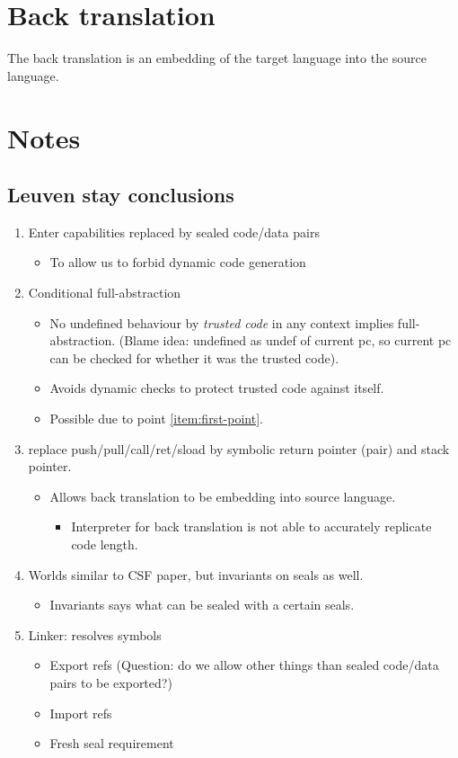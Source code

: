\documentclass[a4paper]{article}
\begin{document}
\clearpage
\section{Back translation}
The back translation is an embedding of the target language into the source language.

\section{Notes}
\subsection{Leuven stay conclusions}
\begin{enumerate}
\item Enter capabilities replaced by sealed code/data pairs \label{item:first-point}
  \begin{itemize}
  \item To allow us to forbid dynamic code generation
  \end{itemize}
\item Conditional full-abstraction
  \begin{itemize}
  \item No undefined behaviour by \emph{trusted code} in any context implies full-abstraction. (Blame idea: undefined as undef of current pc, so current pc can be checked for whether it was the trusted code).
  \item Avoids dynamic checks to protect trusted code against itself.
  \item Possible due to point \ref{item:first-point}.
  \end{itemize}
\item replace push/pull/call/ret/sload by symbolic return pointer (pair) and stack pointer.
  \begin{itemize}
  \item Allows back translation to be embedding into source language.
    \begin{itemize}
    \item Interpreter for back translation is not able to accurately replicate code length.
    \end{itemize}
  \end{itemize}
\item Worlds similar to CSF paper, but invariants on seals as well.
  \begin{itemize}
  \item Invariants says what can be sealed with a certain seals.
  \end{itemize}
\item Linker: resolves symbols
  \begin{itemize}
  \item Export refs (Question: do we allow other things than sealed code/data pairs to be exported?)
  \item Import refs
  \item Fresh seal requirement
  \end{itemize}
\end{enumerate}
\end{document}
